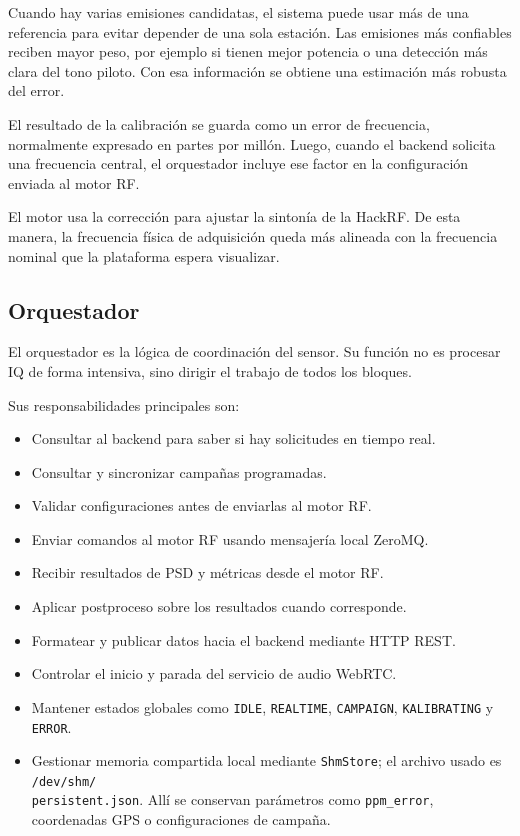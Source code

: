 Cuando hay varias emisiones candidatas, el sistema puede usar más de una referencia
para evitar depender de una sola estación. Las emisiones más confiables reciben
mayor peso, por ejemplo si tienen mejor potencia o una detección más clara del tono
piloto. Con esa información se obtiene una estimación más robusta del error.

El resultado de la calibración se guarda como un error de frecuencia, normalmente
expresado en partes por millón. Luego, cuando el backend solicita una frecuencia
central, el orquestador incluye ese factor en la configuración enviada al motor RF.

El motor usa la corrección para ajustar la sintonía de la HackRF. De esta manera,
la frecuencia física de adquisición queda más alineada con la frecuencia nominal
que la plataforma espera visualizar.

\subsection{Orquestador}

El orquestador es la lógica de coordinación del sensor. Su función no es procesar
IQ de forma intensiva, sino dirigir el trabajo de todos los bloques.

Sus responsabilidades principales son:

\begin{itemize}
  \item Consultar al backend para saber si hay solicitudes en tiempo real.
  \item Consultar y sincronizar campañas programadas.
  \item Validar configuraciones antes de enviarlas al motor RF.
  \item Enviar comandos al motor RF usando mensajería local ZeroMQ.
  \item Recibir resultados de PSD y métricas desde el motor RF.
  \item Aplicar postproceso sobre los resultados cuando corresponde.
  \item Formatear y publicar datos hacia el backend mediante HTTP REST.
  \item Controlar el inicio y parada del servicio de audio WebRTC.
  \item Mantener estados globales como \texttt{IDLE}, \texttt{REALTIME},
  \texttt{CAMPAIGN}, \texttt{KALIBRATING} y \texttt{ERROR}.
  \item Gestionar memoria compartida local mediante \texttt{ShmStore}; el archivo
  usado es \texttt{/dev/shm/}\\\texttt{persistent.json}. Allí se conservan
  parámetros como \texttt{ppm\_error}, coordenadas GPS o configuraciones de
  campaña.
\end{itemize}

